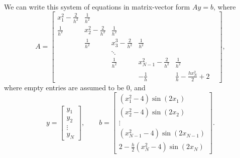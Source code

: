 \documentclass{homework}
\begin{document}
\begin{alphaparts}
\begin{align*}
		\end{align*}
		We can write this system of equations in matrix-vector form $Ay = b$, where
		\begin{equation*}
			A = \left[\begin{matrix}
				x_1^2-\frac{2}{h^2} & \frac{1}{h^2} &  &  & & \\
				\frac{1}{h^2} & x_2^2 - \frac{2}{h^2} & \frac{1}{h^2} &  &  & \\
				 & \frac{1}{h^2} & x_3^3 - \frac{2}{h^2} & \frac{1}{h^2} & &\\
			     & & \ddots &  & \\
				 &  & \frac{1}{h^2} & x_{N-1}^2 - \frac{2}{h^2} & \frac{1}{h^2} \\
				 &  &  & -\frac{1}{h} & \frac{1}{h} - \frac{hx_N^2}{2} +2
			\end{matrix}\right],
		\end{equation*}
		where empty entries are assumed to be 0, and
		\begin{equation*}
			y = \left[\begin{matrix}y_1 \\ y_2 \\ \vdots \\ y_N\end{matrix}\right], \qquad b = \left[\begin{matrix}(x_1^2 - 4)\sin(2x_1) \\[0.3em] (x_2^2-4)\sin(2x_2) \\ \vdots \\ (x_{N-1}^2-4)\sin(2x_{N-1}) \\[0.3em] 2 - \frac{h}{2}(x_N^2 - 4)\sin(2x_N)\end{matrix}\right].
		\end{equation*}
		
		\questionpart
		

\end{alphaparts}
\end{document}
